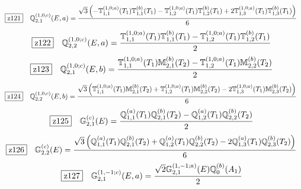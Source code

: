 \documentclass[fleqn,10pt,landscape]{jsarticle}
\begin{document}
\begin{dmath*}
\hspace*{3mm}\fbox{z121}\quad \mathbb{Q}_{2,1}^{(1,0;c)}(E,a)=\frac{\sqrt{3} \left(- \mathbb{T}_{1,1}^{(1,0;a)}(T_{1}) \mathbb{T}_{1,1}^{(b)}(T_{1}) - \mathbb{T}_{1,2}^{(1,0;a)}(T_{1}) \mathbb{T}_{1,2}^{(b)}(T_{1}) + 2 \mathbb{T}_{1,3}^{(1,0;a)}(T_{1}) \mathbb{T}_{1,3}^{(b)}(T_{1})\right)}{6}
\end{dmath*}
\begin{dmath*}
\hspace*{3mm}\fbox{z122}\quad \mathbb{Q}_{2,2}^{(1,0;c)}(E,a)=\frac{\mathbb{T}_{1,1}^{(1,0;a)}(T_{1}) \mathbb{T}_{1,1}^{(b)}(T_{1}) - \mathbb{T}_{1,2}^{(1,0;a)}(T_{1}) \mathbb{T}_{1,2}^{(b)}(T_{1})}{2}
\end{dmath*}
\begin{dmath*}
\hspace*{3mm}\fbox{z123}\quad \mathbb{Q}_{2,1}^{(1,0;c)}(E,b)=\frac{\mathbb{T}_{1,1}^{(1,0;a)}(T_{1}) \mathbb{M}_{2,1}^{(b)}(T_{2}) - \mathbb{T}_{1,2}^{(1,0;a)}(T_{1}) \mathbb{M}_{2,2}^{(b)}(T_{2})}{2}
\end{dmath*}
\begin{dmath*}
\hspace*{3mm}\fbox{z124}\quad \mathbb{Q}_{2,2}^{(1,0;c)}(E,b)=\frac{\sqrt{3} \left(\mathbb{T}_{1,1}^{(1,0;a)}(T_{1}) \mathbb{M}_{2,1}^{(b)}(T_{2}) + \mathbb{T}_{1,2}^{(1,0;a)}(T_{1}) \mathbb{M}_{2,2}^{(b)}(T_{2}) - 2 \mathbb{T}_{1,3}^{(1,0;a)}(T_{1}) \mathbb{M}_{2,3}^{(b)}(T_{2})\right)}{6}
\end{dmath*}
\begin{dmath*}
\hspace*{3mm}\fbox{z125}\quad \mathbb{G}_{2,1}^{(c)}(E)=\frac{\mathbb{Q}_{1,1}^{(a)}(T_{1}) \mathbb{Q}_{2,1}^{(b)}(T_{2}) - \mathbb{Q}_{1,2}^{(a)}(T_{1}) \mathbb{Q}_{2,2}^{(b)}(T_{2})}{2}
\end{dmath*}
\begin{dmath*}
\hspace*{3mm}\fbox{z126}\quad \mathbb{G}_{2,2}^{(c)}(E)=\frac{\sqrt{3} \left(\mathbb{Q}_{1,1}^{(a)}(T_{1}) \mathbb{Q}_{2,1}^{(b)}(T_{2}) + \mathbb{Q}_{1,2}^{(a)}(T_{1}) \mathbb{Q}_{2,2}^{(b)}(T_{2}) - 2 \mathbb{Q}_{1,3}^{(a)}(T_{1}) \mathbb{Q}_{2,3}^{(b)}(T_{2})\right)}{6}
\end{dmath*}
\begin{dmath*}
\hspace*{3mm}\fbox{z127}\quad \mathbb{G}_{2,1}^{(1,-1;c)}(E,a)=\frac{\sqrt{2} \mathbb{G}_{2,1}^{(1,-1;a)}(E) \mathbb{Q}_{0}^{(b)}(A_{1})}{2}
\end{dmath*}
\end{document}
